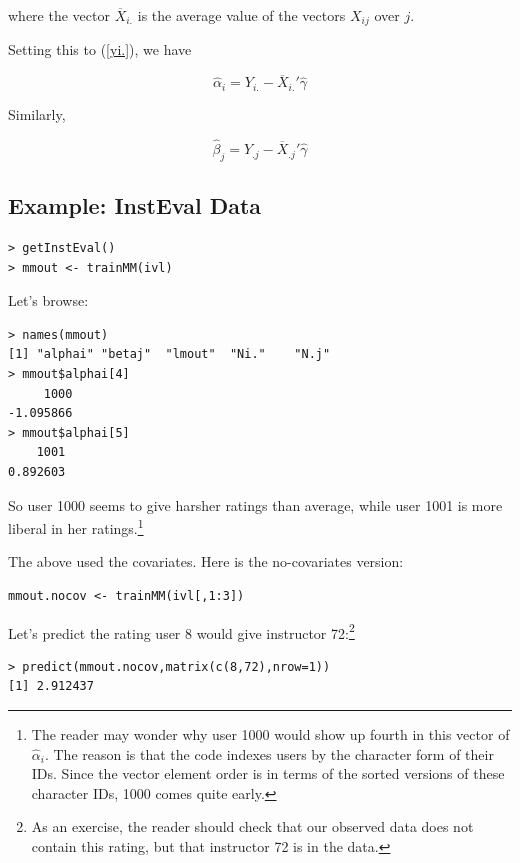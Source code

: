 where the vector $\overline{X}_{i.}$ is the average value of the vectors
$X_{ij}$ over $j$.

Setting this to (\ref{yi.}), we have

\begin{equation}
\widehat{\alpha}_i = 
Y_{i.} -
\overline{X}_{i.}' \widehat{\gamma} 
\end{equation}

Similarly,

\begin{equation}
\widehat{\beta}_j = 
Y_{.j} -
\overline{X}_{.j}' \widehat{\gamma} 
\end{equation}

\subsection{Example:  InstEval Data}

\begin{lstlisting}
> getInstEval()
> mmout <- trainMM(ivl)
\end{lstlisting}

Let's browse:

\begin{lstlisting}
> names(mmout)
[1] "alphai" "betaj"  "lmout"  "Ni."    "N.j" 
> mmout$alphai[4]
     1000 
-1.095866 
> mmout$alphai[5]
    1001 
0.892603 
\end{lstlisting}

So user 1000 seems to give harsher ratings than average, while user 1001
is more liberal in her ratings.\footnote{The reader may wonder why user
1000 would show up fourth in this vector of $\widehat{\alpha}_i$.  The
reason is that the code indexes users by the character form of their
IDs.  Since the vector element order is in terms of the sorted versions
of these character IDs, 1000 comes quite early.}

The above used the covariates.  Here is the no-covariates version:

\begin{lstlisting}
mmout.nocov <- trainMM(ivl[,1:3])
\end{lstlisting}

Let's predict the rating user 8 would give instructor 72:\footnote{As an
exercise, the reader should check that our observed data does not
contain this rating, but that instructor 72 is in the data.}

\begin{lstlisting}
> predict(mmout.nocov,matrix(c(8,72),nrow=1))
[1] 2.912437
\end{lstlisting}


